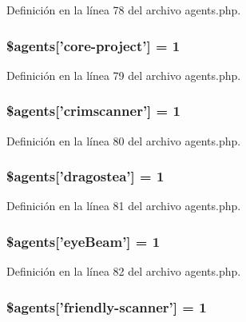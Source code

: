 Definición en la línea 78 del archivo agents.\-php.

\hypertarget{agents_8php_a55db17ba4c3e52cde79dd997dcb1857c}{
\subsubsection[{\$agents}]{\setlength{\rightskip}{0pt plus 5cm}\$agents\mbox{[}'core-\/project'\mbox{]} = 1}}\label{agents_8php_a55db17ba4c3e52cde79dd997dcb1857c}


Definición en la línea 79 del archivo agents.\-php.

\hypertarget{agents_8php_ab8be0786d205b6ccbed8d2cf6e075c71}{
\subsubsection[{\$agents}]{\setlength{\rightskip}{0pt plus 5cm}\$agents\mbox{[}'crimscanner'\mbox{]} = 1}}\label{agents_8php_ab8be0786d205b6ccbed8d2cf6e075c71}


Definición en la línea 80 del archivo agents.\-php.

\hypertarget{agents_8php_a118576335ae0affe3b3583b7a8c55be1}{
\subsubsection[{\$agents}]{\setlength{\rightskip}{0pt plus 5cm}\$agents\mbox{[}'dragostea'\mbox{]} = 1}}\label{agents_8php_a118576335ae0affe3b3583b7a8c55be1}


Definición en la línea 81 del archivo agents.\-php.

\hypertarget{agents_8php_a1a9d4edac8bb3c46d86eaca6e270bff3}{
\subsubsection[{\$agents}]{\setlength{\rightskip}{0pt plus 5cm}\$agents\mbox{[}'eye\-Beam'\mbox{]} = 1}}\label{agents_8php_a1a9d4edac8bb3c46d86eaca6e270bff3}


Definición en la línea 82 del archivo agents.\-php.

\hypertarget{agents_8php_a4ffde91813d5faba7d3c4a87bf9daa10}{
\subsubsection[{\$agents}]{\setlength{\rightskip}{0pt plus 5cm}\$agents\mbox{[}'friendly-\/scanner'\mbox{]} = 1}}\label{agents_8php_a4ffde91813d5faba7d3c4a87bf9daa10}


